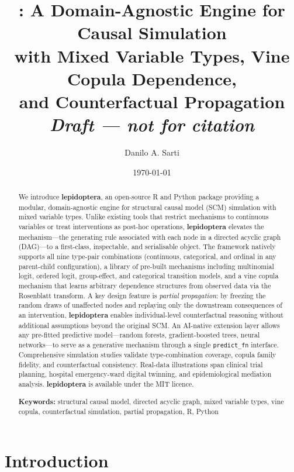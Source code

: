\documentclass[12pt,a4paper]{article}
\title{\textbf{\pkg{lepidoptera}: A Domain-Agnostic Engine for Causal Simulation\\
with Mixed Variable Types, Vine Copula Dependence,\\
and Counterfactual Propagation}\\[1em]
\large \textit{Draft — not for citation}}
\author{Danilo A. Sarti\\
\small \email{daniloasarti@gmail.com}}
\date{\today}
\newcommand{\pkg}[1]{\textbf{#1}}
\newcommand{\code}[1]{\texttt{#1}}
\begin{document}
\maketitle
\tableofcontents
\newpage

\begin{abstract}
We introduce \pkg{lepidoptera}, an open-source R and Python package providing a modular, domain-agnostic engine for structural causal model (SCM) simulation with mixed variable types. Unlike existing tools that restrict mechanisms to continuous variables or treat interventions as post-hoc operations, \pkg{lepidoptera} elevates the mechanism---the generating rule associated with each node in a directed acyclic graph (DAG)---to a first-class, inspectable, and serialisable object. The framework natively supports all nine type-pair combinations (continuous, categorical, and ordinal in any parent-child configuration), a library of pre-built mechanisms including multinomial logit, ordered logit, group-effect, and categorical transition models, and a vine copula mechanism that learns arbitrary dependence structures from observed data via the Rosenblatt transform. A key design feature is \emph{partial propagation}: by freezing the random draws of unaffected nodes and replaying only the downstream consequences of an intervention, \pkg{lepidoptera} enables individual-level counterfactual reasoning without additional assumptions beyond the original SCM. An AI-native extension layer allows any pre-fitted predictive model---random forests, gradient-boosted trees, neural networks---to serve as a generative mechanism through a single \code{predict\_fn} interface. Comprehensive simulation studies validate type-combination coverage, copula family fidelity, and counterfactual consistency. Real-data illustrations span clinical trial planning, hospital emergency-ward digital twinning, and epidemiological mediation analysis. \pkg{lepidoptera} is available under the MIT licence.

\bigskip\noindent\textbf{Keywords:} structural causal model, directed acyclic graph, mixed variable types, vine copula, counterfactual simulation, partial propagation, R, Python
\end{abstract}

\section{Introduction}
\label{sec:intro}
\end{document}
